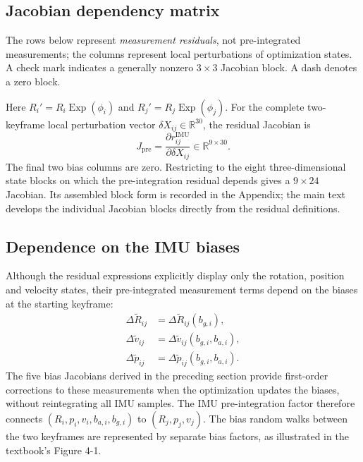 \documentclass[11pt,a4paper]{article}
\newcommand{\Exp}{\operatorname{Exp}}
\begin{document}
\subsection{Jacobian dependency matrix}
The rows below represent \emph{measurement residuals}, not
pre-integrated measurements; the columns represent local perturbations
of optimization states. A check mark indicates a generally nonzero
$3\times3$ Jacobian block. A dash denotes a zero block.
\begin{center}
\begingroup\setlength{\tabcolsep}{4pt}\renewcommand{\arraystretch}{1.25}
\endgroup
\end{center}
Here $R_i'=R_i\Exp(\phi_i)$ and $R_j'=R_j\Exp(\phi_j)$.
For the complete two-keyframe local perturbation vector
$\delta X_{ij}\in\mathbb R^{30}$, the residual Jacobian is
\begin{equation}
 J_{\mathrm{pre}}=\frac{\partial r_{ij}^{\mathrm{IMU}}}
 {\partial\delta X_{ij}}\in\mathbb R^{9\times30}.
\end{equation}
The final two bias columns are zero. Restricting to the eight
three-dimensional state blocks on which the pre-integration residual
depends gives a $9\times24$ Jacobian. Its assembled block form is
recorded in the Appendix; the main text develops the individual
Jacobian blocks directly from the residual definitions.

\subsection{Dependence on the IMU biases}
Although the residual expressions explicitly display only the
rotation, position and velocity states, their pre-integrated
measurement terms depend on the biases at the starting keyframe:
\begin{align}
 \Delta\tilde R_{ij}&=\Delta\tilde R_{ij}(b_{g,i}),\\
 \Delta\tilde v_{ij}&=\Delta\tilde v_{ij}(b_{g,i},b_{a,i}),\\
 \Delta\tilde p_{ij}&=\Delta\tilde p_{ij}(b_{g,i},b_{a,i}).
\end{align}
The five bias Jacobians derived in the preceding section provide
first-order corrections to these measurements when the optimization
updates the biases, without reintegrating all IMU samples.
The IMU pre-integration factor therefore connects
$(R_i,p_i,v_i,b_{a,i},b_{g,i})$ to $(R_j,p_j,v_j)$.
The bias random walks between the two keyframes are represented by
separate bias factors, as illustrated in the textbook's Figure 4-1.
\end{document}
